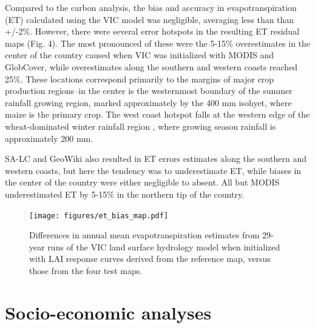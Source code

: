 \documentclass{pnastwo}
\begin{document}
\begin{article}
Compared to the carbon analysis, the bias and accuracy in evapotranspiration (ET) calculated using the VIC model was negligible, averaging less than than +/-2\%. However, there were several error hotspots in the resulting ET residual maps (Fig. 4). The most pronounced of these were the 5-15\% overestimates in the center of the country caused when VIC was initialized with MODIS and GlobCover, while overestimates along the southern and western coasts reached 25\%. These locations correspond primarily to the margins of major crop production regions--in the center is the westernmost boundary of the summer rainfall growing region, marked approximately by the 400 mm isohyet, where maize is the primary crop. The west coast hotspot falls at the western edge of the wheat-dominated winter rainfall region \cite{hardy_rainfed_2011}, where growing season rainfall is approximately 200 mm. 

SA-LC and GeoWiki also resulted in ET errors estimates along the southern and western coasts, but here the tendency was to underestimate ET, while biases in the center of the country were either negligible to absent.  All but MODIS underestimated ET by 5-15\% in the northern tip of the country.  



\begin{figure}[!h]
\centerline{\texttt{[image: figures/et\_bias\_map.pdf]}}
\caption{Differences in annual mean evapotranspiration estimates from 29-year runs of the VIC land surface hydrology model when initialized with LAI response curves derived from the reference map, versus those from the four test maps.}\label{afoto}
\end{figure}

\section{Socio-economic analyses}

\end{article}
\end{document}
